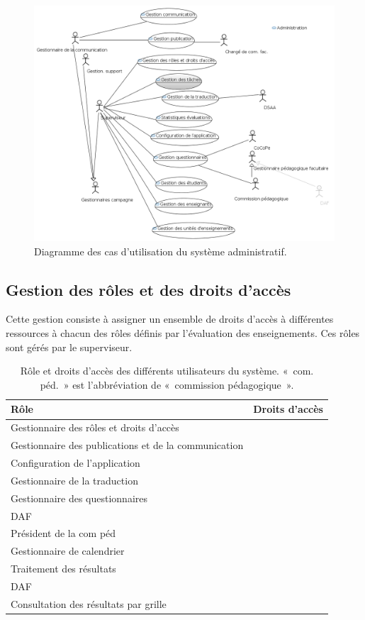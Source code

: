 \documentclass[a4paper,11pt]{report}
\begin{document}
\begin{figure}[ht]
\includegraphics[width=\linewidth]{workspace/evalens-usecases/administration.png}
\caption{Diagramme des cas d'utilisation du système administratif.}
\label{fig:usecase-admin}
\end{figure}


\subsection{Gestion des rôles et des droits d'accès}
Cette gestion consiste à assigner un ensemble de droits d'accès à différentes ressources à chacun des rôles définis par l'évaluation des enseignements.
Ces rôles sont gérés par le superviseur.

\begin{table}[ht]
\begin{tabularx}{\textwidth}{|l|X|} \hline
Rôle & Droits d'accès \\ \hline
Gestionnaire des rôles et droits d'accès & \\ \hline
Gestionnaire des publications et de la communication & \\ \hline
Configuration de l'application & \\ \hline
Gestionnaire de la traduction & \\ \hline
Gestionnaire des questionnaires & \\ \hline
DAF & \\ \hline
Président de la com péd & \\ \hline
Gestionnaire de calendrier & \\ \hline
Traitement des résultats & \\ \hline
DAF & \\ \hline
Consultation des résultats par grille & \\ \hline

\end{tabularx}
\caption{Rôle et droits d'accès des différents utilisateurs du système. «~com. péd.~» est l'abbréviation de «~commission pédagogique~».}
\label{tab:role-droit}
\end{table}
\end{document}
